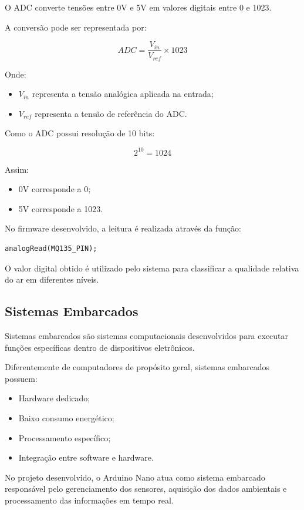 \documentclass[a4paper,12pt]{article}
\begin{document}
O ADC converte tensões entre 0V e 5V em valores digitais entre 0 e 1023.

A conversão pode ser representada por:

\[
ADC = \frac{V_{in}}{V_{ref}} \times 1023
\]

Onde:
\begin{itemize}
    \item $V_{in}$ representa a tensão analógica aplicada na entrada;
    \item $V_{ref}$ representa a tensão de referência do ADC.
\end{itemize}

Como o ADC possui resolução de 10 bits:

\[
2^{10} = 1024
\]

Assim:
\begin{itemize}
    \item 0V corresponde a 0;
    \item 5V corresponde a 1023.
\end{itemize}

No firmware desenvolvido, a leitura é realizada através da função:

\begin{verbatim}
analogRead(MQ135_PIN);
\end{verbatim}

O valor digital obtido é utilizado pelo sistema para classificar a qualidade relativa do ar em diferentes níveis.

\subsection{Sistemas Embarcados}

Sistemas embarcados são sistemas computacionais desenvolvidos para executar funções específicas dentro de dispositivos eletrônicos.

Diferentemente de computadores de propósito geral, sistemas embarcados possuem:
\begin{itemize}
    \item Hardware dedicado;
    \item Baixo consumo energético;
    \item Processamento específico;
    \item Integração entre software e hardware.
\end{itemize}

No projeto desenvolvido, o Arduino Nano atua como sistema embarcado responsável pelo gerenciamento dos sensores, aquisição dos dados ambientais e processamento das informações em tempo real.
\end{document}
